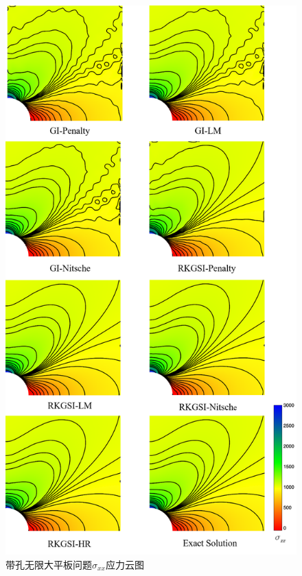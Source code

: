 \newpage
\begin{figure}[H]
\centering
   \includegraphics[scale=0.5]{figure/EHR/hole/sigmaxx.png}
\caption{带孔无限大平板问题$\sigma_{xx}$应力云图}\label{sigmaxx}
\end{figure} 
